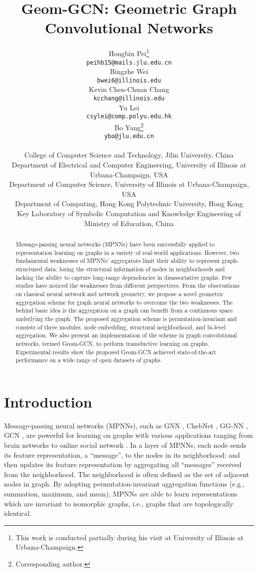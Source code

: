 \documentclass{article} \usepackage{iclr2020_conference,times}
\title{Geom-GCN: Geometric Graph Convolutional Networks}
\author{Hongbin Pei\thanks{
This work is conducted partially during his visit at University of Illinois at Urbana-Champaign.}\\
\texttt{peihb15@mails.jlu.edu.cn} \\
\And Bingzhe Wei\\
\texttt{bwei6@illinois.edu} \\
\And Kevin Chen-Chuan Chang \\
\texttt{kcchang@illinois.edu} \\
\And Yu Lei \\
\texttt{csylei@comp.polyu.edu.hk} \\
\And Bo Yang\thanks{Corresponding author.}\\
\texttt{ybo@jlu.edu.cn} \\
\AND
\vspace{-5mm}
~\\ 
College of Computer Science and Technology, Jilin University, China \\
Department of Electrical and Computer Engineering, University of Illinois at Urbana-Champaign, USA\\
Department of Computer Science, University of Illinois at Urbana-Champaign, USA \\
Department of Computing, Hong Kong Polytechnic University, Hong Kong\\
Key Laboratory of Symbolic Computation and Knowledge Engineering of Ministry of Education, China
}
\begin{document}
\maketitle

\begin{abstract}
Message-passing neural networks (MPNNs) have been successfully applied to representation learning on graphs in a variety of real-world applications.
However, two fundamental weaknesses of MPNNs' aggregators limit their ability to represent graph-structured data: losing the structural information of nodes in neighborhoods and lacking the ability to capture long-range dependencies in disassortative graphs.
Few studies have noticed the weaknesses from different perspectives.
From the observations on classical neural network and network geometry, we propose a novel geometric aggregation scheme for graph neural networks to overcome the two weaknesses. 
The behind basic idea is the aggregation on a graph can benefit from a continuous space underlying the graph.
The proposed aggregation scheme is permutation-invariant and consists of three modules, node embedding, structural neighborhood, and bi-level aggregation.
We also present an implementation of the scheme in graph convolutional networks, termed Geom-GCN, to perform transductive learning on graphs.
Experimental results show the proposed Geom-GCN achieved state-of-the-art performance on a wide range of open datasets of graphs.
\end{abstract}

\section{Introduction}
Message-passing neural networks (MPNNs), such as GNN \citep{scarselli2008graph}, ChebNet \citep{defferrard2016convolutional}, GG-NN \citep{DBLP:journals/corr/LiTBZ15}, GCN \citep{DBLP:conf/iclr/KipfW17}, are powerful for learning on graphs with various applications ranging from brain networks to online social network \citep{DBLP:conf/icml/GilmerSRVD17,DBLP:conf/kdd/WangXLLCDWS19}.
In a layer of MPNNs, each node sends its feature representation, a ``message'', to the nodes in its neighborhood; 
and then updates its feature representation by aggregating all ``messages'' received from the neighborhood.
The neighborhood is often defined as the set of adjacent nodes in graph.
By adopting permutation-invariant aggregation functions (e.g., summation, maximum, and mean), MPNNs are able to learn representations which are invariant to isomorphic graphs, i.e., graphs that are topologically identical.
\end{document}
